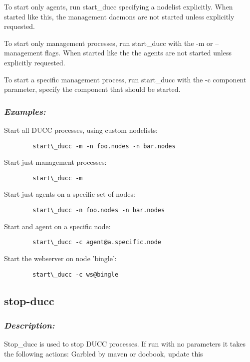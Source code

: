       To start only agents, run start\_ducc specifying a nodelist explicitly. When started like this, the 
      management daemons are not started unless explicitly requested. 
      
      To start only management processes, run start\_ducc with the -m or --management flags. When 
      started like the the agents are not started unless explicitly requested. 
      
      To start a specific management process, run start\_ducc with the -c component parameter, 
      specify the component that should be started. 
  
      \subsubsection{{\em Examples: }}

      Start all DUCC processes, using custom nodelists: 
\begin{verbatim}
        start\_ducc -m -n foo.nodes -n bar.nodes 
\end{verbatim}
      
      Start just management processes: 
\begin{verbatim}
        start\_ducc -m 
\end{verbatim}
      
      Start just agents on a specific set of nodes: 
\begin{verbatim}
        start\_ducc -n foo.nodes -n bar.nodes 
\end{verbatim}
      
      Start and agent on a specific node: 
\begin{verbatim}
        start\_ducc -c agent@a.specific.node 
\end{verbatim}
      
      Start the webserver on node 'bingle': 
\begin{verbatim}
        start\_ducc -c ws@bingle 
\end{verbatim}

    
\subsection{stop-ducc}

    \subsubsection{{\em Description:}}
    Stop\_ducc is used to stop DUCC processes. If run with no parameters it takes the following 
    actions:
    \todo Garbled by maven or docbook, update this

